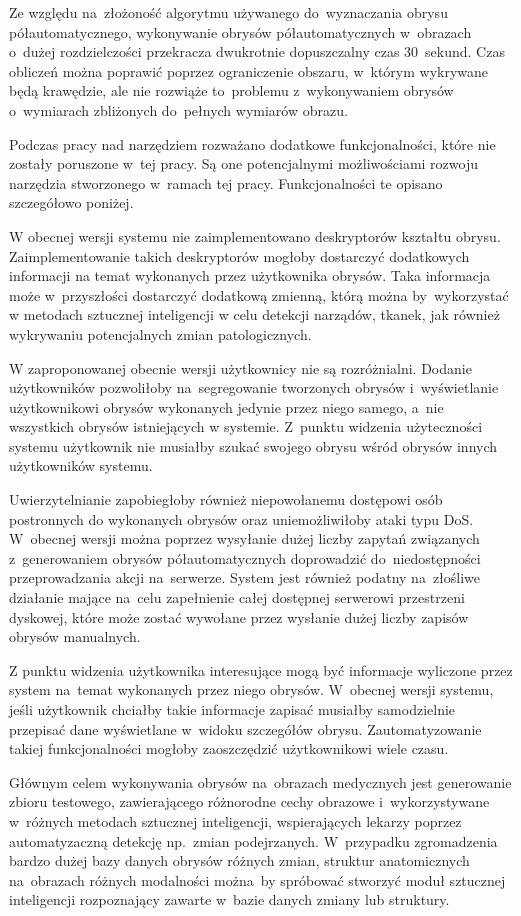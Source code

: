 \documentclass[a4paper,11pt,twoside,openright]{report}
\theoremstyle{definition}
\begin{document}
Ze względu na~złożoność algorytmu używanego do~wyznaczania obrysu półautomatycznego,
wykonywanie obrysów półautomatycznych w~obrazach o~dużej rozdzielczości przekracza
dwukrotnie dopuszczalny czas 30~sekund. Czas
obliczeń można poprawić poprzez ograniczenie obszaru, w~którym wykrywane będą
krawędzie, ale nie rozwiąże to~problemu z~wykonywaniem obrysów o~wymiarach
zbliżonych do~pełnych wymiarów obrazu.

Podczas pracy nad narzędziem rozważano dodatkowe funkcjonalności, które nie zostały
poruszone w~tej pracy. Są one potencjalnymi możliwościami rozwoju narzędzia
stworzonego w~ramach tej pracy. Funkcjonalności te opisano szczegółowo poniżej.

W obecnej wersji systemu nie zaimplementowano deskryptorów kształtu obrysu.
Zaimplementowanie takich deskryptorów mogłoby dostarczyć dodatkowych informacji
na temat wykonanych przez użytkownika obrysów. Taka informacja może w~przyszłości
dostarczyć dodatkową zmienną, którą można by~wykorzystać w metodach sztucznej
inteligencji w celu detekcji narządów, tkanek, jak również wykrywaniu potencjalnych zmian patologicznych.

W zaproponowanej obecnie wersji użytkownicy nie są rozróżnialni. Dodanie użytkowników
pozwoliłoby na~segregowanie tworzonych obrysów i~wyświetlanie użytkownikowi
obrysów wykonanych jedynie przez niego samego, a~nie wszystkich obrysów istniejących
w systemie. Z~punktu widzenia użyteczności systemu użytkownik nie musiałby szukać
swojego obrysu wśród obrysów innych użytkowników systemu.

Uwierzytelnianie zapobiegłoby również niepowołanemu dostępowi osób postronnych
do wykonanych obrysów oraz uniemożliwiłoby ataki typu DoS. W~obecnej wersji można
poprzez wysyłanie dużej liczby zapytań związanych z~generowaniem obrysów półautomatycznych
doprowadzić do~niedostępności przeprowadzania akcji na~serwerze. System jest również
podatny na~złośliwe działanie mające na~celu zapełnienie całej dostępnej serwerowi
przestrzeni dyskowej, które może zostać wywołane przez wysłanie dużej liczby
zapisów obrysów manualnych.

Z punktu widzenia użytkownika interesujące mogą być informacje wyliczone przez
system na~temat wykonanych przez niego obrysów. W~obecnej wersji systemu, jeśli
użytkownik chciałby takie informacje zapisać musiałby samodzielnie przepisać dane
wyświetlane w~widoku szczegółów obrysu. Zautomatyzowanie takiej funkcjonalności
mogłoby zaoszczędzić użytkownikowi wiele czasu.

Głównym celem wykonywania obrysów na~obrazach medycznych jest generowanie zbioru
testowego, zawierającego różnorodne cechy obrazowe i~wykorzystywane w~różnych
metodach sztucznej inteligencji, wspierających lekarzy poprzez automatyzaczną
detekcję np.~zmian podejrzanych. W~przypadku zgromadzenia bardzo dużej bazy danych
obrysów różnych zmian, struktur anatomicznych na~obrazach różnych modalności można~by
spróbować stworzyć moduł sztucznej inteligencji rozpoznający zawarte w~bazie danych zmiany lub struktury.
\end{document}
